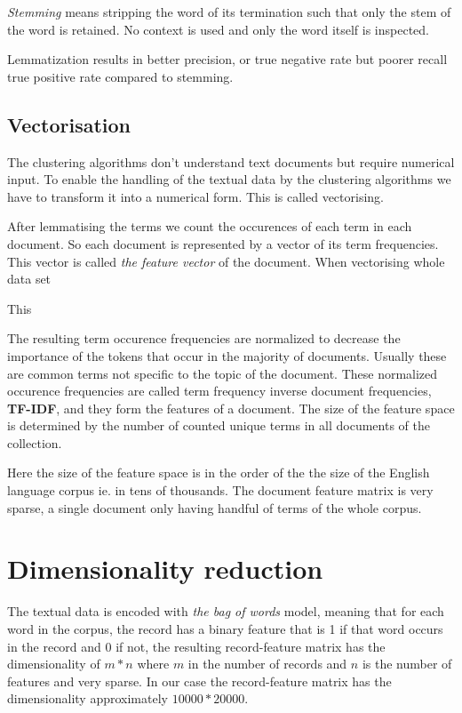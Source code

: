 \emph{Stemming} means stripping the word of its termination such 
that only the stem of the word is retained. No context is used 
and only the word itself is inspected.

Lemmatization results in better precision, or true negative rate 
but poorer recall true positive rate compared to stemming. 
\cite{ref_here}


\subsection{Vectorisation}
The clustering algorithms don't understand text documents but 
require numerical input. To enable the handling of the textual 
data by the clustering algorithms we have to transform it into a
numerical form. This is called vectorising.

After lemmatising the terms we count the occurences 
of each term in each document. So each document is represented by
a vector of its term frequencies. This vector is called \emph{the 
feature vector} of the document. When vectorising whole data set

This 

The resulting term occurence 
frequencies are normalized to decrease the importance of the 
tokens that occur in the majority of documents. Usually these are 
common terms not specific to the topic of the document. 
These normalized occurence frequencies are called term 
frequency inverse document frequencies, \textbf{TF-IDF}, and 
they form the features of a document. The size of the feature 
space is determined by the number of counted unique terms in all 
documents of the collection. 

Here the size of the feature space is in the order of the the 
size of the English language corpus ie. in tens of thousands. The 
document feature matrix is very sparse, a single document only 
having handful of terms of the whole corpus. 



\section{Dimensionality reduction}
\label{sec:dimensionalityreduction}
The textual data is encoded with \emph{the bag of words} model, 
meaning that for each word in the corpus, the record has a binary feature that is 1 
if that word occurs in the record and 0 if not, the resulting 
record-feature matrix has the dimensionality of $m*n$ where $m$ in 
the number of records and $n$ is the number of features and very 
sparse. In our case the record-feature matrix has the 
dimensionality approximately $10000*20000$. 


